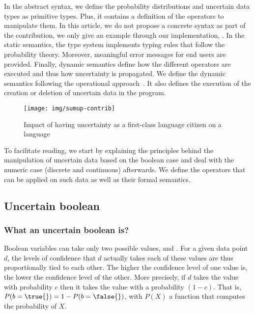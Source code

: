 In the abstract syntax, we define the probability distributions and uncertain data types as primitive types.
Plus, it contains a definition of the operators to manipulate them.
In this article, we do not propose a concrete syntax as part of the contribution, we only give an example through our implementation, \languageName{}.
In the static semantics, the type system implements typing rules that follow the probability theory.
Moreover, meaningful error messages for end users are provided.
Finally, dynamic semantics define how the different operators are executed and thus how uncertainty is propagated.
We define the dynamic semantics following the operational approach~\cite{DBLP:conf/ershov/Mosses01}.
It also defines the execution of the creation or deletion of uncertain data in the program.

\begin{figure}
	\centering
	\texttt{[image: img/sumup-contrib]}
	\caption{Impact of having uncertainty as a first-class language citizen on a language}
	\label{fig:contrib-summary}
\end{figure}


To facilitate reading, we start by explaining the principles behind the manipulation of uncertain data based on the boolean case and deal with the numeric case (discrete and continuous) afterwards. 
We define the operators that can be applied on such data as well as their formal semantics.

\subsection{Uncertain boolean}

\subsubsection{What an uncertain boolean is?}
Boolean variables can take only two possible values, \true{} and \false{}.
For a given data point $d$, the levels of confidence that $d$ actually takes each of these values are thus proportionally tied to each other. The higher the confidence level of one value is, the lower the confidence level of the other.
More precisely, if $d$ takes the value \true{} with probability $c$ then it takes the value \false{} with a probability $(1-c)$.
That is, $P(b=\true{}) = 1 - P(b=\false{})$, with $P(X)$ a function that computes the probability of $X$.

